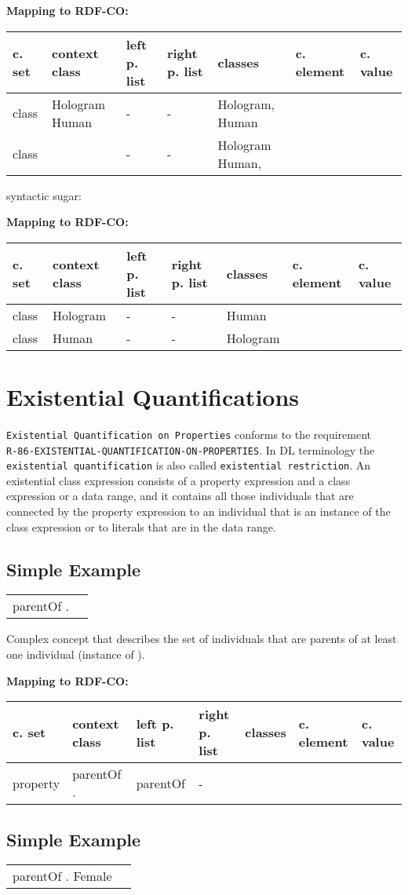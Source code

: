\documentclass{llncs}
\newcommand{\ms}[1]{\texttt{#1}}
\newenvironment{gcotable}{
  \scriptsize
  \sffamily
  \vspace{0cm}
	\begin{center}
	\textbf{\vspace{0.4cm}Mapping to RDF-CO:} \\
  \begin{tabular}{l|l|l|l|l|l|l}
	\hline
  \textbf{c. set} & \textbf{context class} & \textbf{left p. list} & \textbf{right p. list} & \textbf{classes} & \textbf{c. element} & \textbf{c. value} \\
  \hline

}{
  \hline
  \end{tabular}
	\end{center}
}
\newenvironment{DL}{
\vspace{0cm}
	\begin{center}
  \begin{tabular}{r l}

}{
  \end{tabular}
	\end{center}
}
\begin{document}
\begin{gcotable}
class & Hologram  Human & - & - & Hologram, Human &   \\
class &  & - & - & Hologram  Human,  &  \\
\end{gcotable}

syntactic sugar:

\begin{gcotable}
class & Hologram & - & - & Human &  \\
class & Human & - & - & Hologram &  \\
\end{gcotable}

\section{Existential Quantifications}

\ms{Existential Quantification on Properties} conforms to the requirement \\
\ms{R-86-EXISTENTIAL-QUANTIFICATION-ON-PROPERTIES}.
In DL terminology the \ms{existential quantification} is also called \ms{existential restriction}.
An existential class expression consists of a property expression and a class expression or a data range, and it contains all those individuals that are connected by the property expression to an individual that is an instance of the class expression or to literals that are in the data range.  

\subsection{Simple Example}

\begin{DL}
 parentOf . 
\end{DL}

Complex concept that describes the set
of individuals that are parents of at least one individual (instance of ). 

\begin{gcotable}
property &  parentOf .  & parentOf & - &  &  \\
\end{gcotable}

\subsection{Simple Example}

\begin{DL}
 parentOf . Female
\end{DL}
\end{document}
